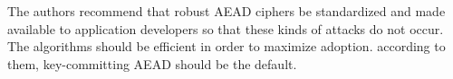 \documentclass[9pt, a4paper]{article}
\begin{document}
The authors recommend that robust AEAD ciphers be standardized and made available to application developers so that these kinds of attacks do not occur. The algorithms should be efficient in order to maximize adoption. according to them, key-committing AEAD should be the default.


\footnotesize 
\end{document}
